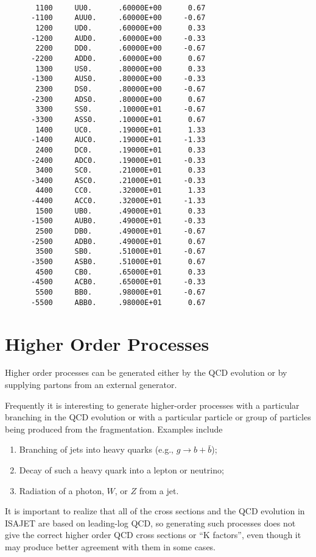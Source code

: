 \begin{verbatim}
                     
       1100     UU0.      .60000E+00      0.67
      -1100     AUU0.     .60000E+00     -0.67
       1200     UD0.      .60000E+00      0.33
      -1200     AUD0.     .60000E+00     -0.33
       2200     DD0.      .60000E+00     -0.67
      -2200     ADD0.     .60000E+00      0.67
       1300     US0.      .80000E+00      0.33
      -1300     AUS0.     .80000E+00     -0.33
       2300     DS0.      .80000E+00     -0.67
      -2300     ADS0.     .80000E+00      0.67
       3300     SS0.      .10000E+01     -0.67
      -3300     ASS0.     .10000E+01      0.67
       1400     UC0.      .19000E+01      1.33
      -1400     AUC0.     .19000E+01     -1.33
       2400     DC0.      .19000E+01      0.33
      -2400     ADC0.     .19000E+01     -0.33
       3400     SC0.      .21000E+01      0.33
      -3400     ASC0.     .21000E+01     -0.33
       4400     CC0.      .32000E+01      1.33
      -4400     ACC0.     .32000E+01     -1.33
       1500     UB0.      .49000E+01      0.33
      -1500     AUB0.     .49000E+01     -0.33
       2500     DB0.      .49000E+01     -0.67
      -2500     ADB0.     .49000E+01      0.67
       3500     SB0.      .51000E+01     -0.67
      -3500     ASB0.     .51000E+01      0.67
       4500     CB0.      .65000E+01      0.33
      -4500     ACB0.     .65000E+01     -0.33
       5500     BB0.      .98000E+01     -0.67
      -5500     ABB0.     .98000E+01      0.67
\end{verbatim}
\newpage
\section{Higher Order Processes\label{HIGHER}}

      Higher order processes can be generated either by the QCD
evolution or by supplying partons from an external generator.

      Frequently it is interesting to generate higher-order processes
with a particular branching in the QCD evolution or with a particular
particle or group of particles being produced from the fragmentation.
Examples include
\begin{enumerate}
\item Branching of jets into heavy quarks (e.g., $g \to b + \bar b$);
\item Decay of such a heavy quark into a lepton or neutrino;
\item Radiation of a photon, $W$, or $Z$ from a jet.
\end{enumerate}
It is important to realize that all of the cross sections and the QCD
evolution in ISAJET are based on leading-log QCD, so generating such
processes does not give the correct higher order QCD cross sections or
``K factors'', even though it may produce better agreement with them in
some cases. 

